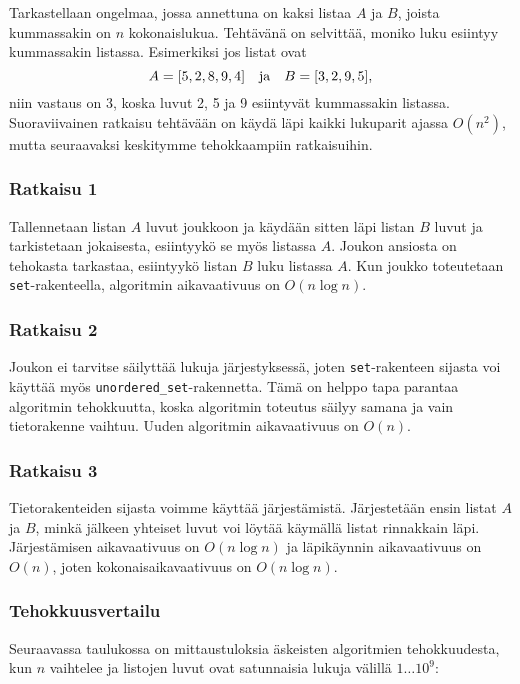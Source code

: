 Tarkastellaan ongelmaa, jossa
annettuna on kaksi listaa $A$ ja $B$,
joista kummassakin on $n$ kokonaislukua.
Tehtävänä on selvittää, moniko luku
esiintyy kummassakin listassa.
Esimerkiksi jos listat ovat
\[A = [5,2,8,9,4] \hspace{10px} \textrm{ja} \hspace{10px} B = [3,2,9,5],\]
niin vastaus on 3, koska luvut 2, 5
ja 9 esiintyvät kummassakin listassa.
Suoraviivainen ratkaisu tehtävään on käydä läpi
kaikki lukuparit ajassa $O(n^2)$, mutta seuraavaksi
keskitymme tehokkaampiin ratkaisuihin.

\subsubsection{Ratkaisu 1}

Tallennetaan listan $A$ luvut joukkoon
ja käydään sitten läpi listan $B$ luvut ja
tarkistetaan jokaisesta, esiintyykö se myös listassa $A$.
Joukon ansiosta on tehokasta tarkastaa,
esiintyykö listan $B$ luku listassa $A$.
Kun joukko toteutetaan \texttt{set}-rakenteella,
algoritmin aikavaativuus on $O(n \log n)$.

\subsubsection{Ratkaisu 2}

Joukon ei tarvitse säilyttää lukuja
järjestyksessä, joten
\texttt{set}-ra\-ken\-teen sijasta voi
käyttää myös \texttt{unordered\_set}-ra\-ken\-net\-ta.
Tämä on helppo tapa parantaa algoritmin
tehokkuutta, koska
algoritmin toteutus säilyy samana ja vain tietorakenne vaihtuu.
Uuden algoritmin aikavaativuus on $O(n)$.

\subsubsection{Ratkaisu 3}

Tietorakenteiden sijasta voimme käyttää järjestämistä.
Järjestetään ensin listat $A$ ja $B$,
minkä jälkeen yhteiset luvut voi löytää
käymällä listat rinnakkain läpi.
Järjestämisen aikavaativuus on $O(n \log n)$ ja
läpikäynnin aikavaativuus on $O(n)$,
joten kokonaisaikavaativuus on $O(n \log n)$.

\subsubsection{Tehokkuusvertailu}

Seuraavassa taulukossa on mittaustuloksia
äskeisten algoritmien tehokkuudesta,
kun $n$ vaihtelee ja listojen luvut ovat
satunnaisia lukuja välillä $1 \ldots 10^9$:

